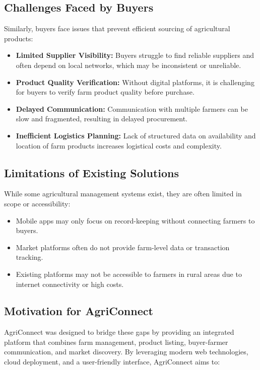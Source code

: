 \documentclass[12pt,a4paper]{article}
\begin{document}
\subsection{Challenges Faced by Buyers}
Similarly, buyers face issues that prevent efficient sourcing of agricultural products:

\begin{itemize}
    \item \textbf{Limited Supplier Visibility:} Buyers struggle to find reliable suppliers and often depend on local networks, which may be inconsistent or unreliable.
    \item \textbf{Product Quality Verification:} Without digital platforms, it is challenging for buyers to verify farm product quality before purchase.
    \item \textbf{Delayed Communication:} Communication with multiple farmers can be slow and fragmented, resulting in delayed procurement.
    \item \textbf{Inefficient Logistics Planning:} Lack of structured data on availability and location of farm products increases logistical costs and complexity.
\end{itemize}

\subsection{Limitations of Existing Solutions}
While some agricultural management systems exist, they are often limited in scope or accessibility:

\begin{itemize}
    \item Mobile apps may only focus on record-keeping without connecting farmers to buyers.
    \item Market platforms often do not provide farm-level data or transaction tracking.
    \item Existing platforms may not be accessible to farmers in rural areas due to internet connectivity or high costs.
\end{itemize}

\subsection{Motivation for AgriConnect}
AgriConnect was designed to bridge these gaps by providing an integrated platform that combines farm management, product listing, buyer-farmer communication, and market discovery. By leveraging modern web technologies, cloud deployment, and a user-friendly interface, AgriConnect aims to:
\end{document}

